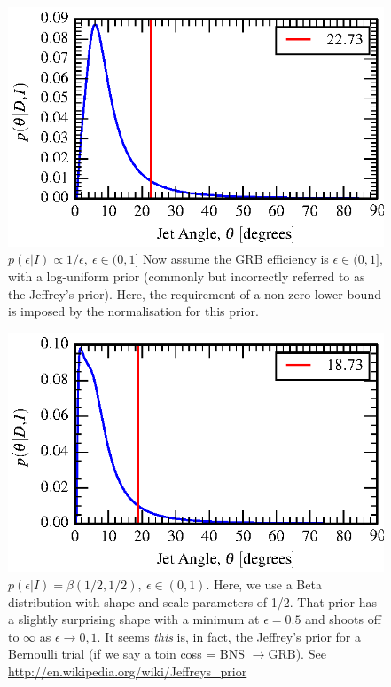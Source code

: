 \documentclass[nofootinbib]{revtex4}
\begin{document}
\begin{figure}[h!]
\includegraphics{jet_angle_posterior_s6UL_TEST_logEffPrior-0.01-1.eps}
\caption{$p(\epsilon|I) \propto 1/\epsilon,~\epsilon \in (0,1]$
Now assume the GRB efficiency is $\epsilon \in (0,1]$, with a log-uniform
prior (commonly but incorrectly referred to as the Jeffrey's prior).  Here, the
requirement of a non-zero lower bound is imposed by the normalisation for this
prior.
}
\end{figure}

\begin{figure}[h!]
\includegraphics{jet_angle_posterior_s6UL_TEST_bernoEffPrior.eps}
\caption{$p(\epsilon|I) = \beta(1/2,1/2),~\epsilon \in (0,1)$.  Here, we use a
Beta distribution with shape and scale parameters of 1/2.  That prior has a
slightly surprising shape with a minimum at $\epsilon=0.5$ and shoots off to
$\infty$ as $\epsilon\rightarrow 0,1$.  It seems \emph{this} is, in fact, the
Jeffrey's prior for a Bernoulli trial (if we say a toin coss = BNS
$\rightarrow$GRB). See
\href{http://en.wikipedia.org/wiki/Jeffreys_prior}{http://en.wikipedia.org/wiki/Jeffreys\_prior}
}
\end{figure}
\end{document}
